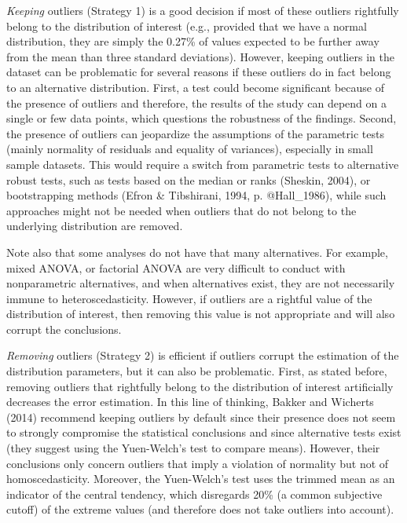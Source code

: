 \documentclass[man,floatsintext]{apa6}
\begin{document}
\emph{Keeping} outliers (Strategy 1) is a good decision if most of these outliers rightfully belong to the distribution of interest (e.g., provided that we have a normal distribution, they are simply the 0.27\% of values expected to be further away from the mean than three standard deviations). However, keeping outliers in the dataset can be problematic for several reasons if these outliers do in fact belong to an alternative distribution. First, a test could become significant because of the presence of outliers and therefore, the results of the study can depend on a single or few data points, which questions the robustness of the findings. Second, the presence of outliers can jeopardize the assumptions of the parametric tests (mainly normality of residuals and equality of variances), especially in small sample datasets. This would require a switch from parametric tests to alternative robust tests, such as tests based on the median or ranks (Sheskin, 2004), or bootstrapping methods (Efron \& Tibshirani, 1994, p. @Hall\_1986), while such approaches might not be needed when outliers that do not belong to the underlying distribution are removed.

Note also that some analyses do not have that many alternatives. For example, mixed ANOVA, or factorial ANOVA are very difficult to conduct with nonparametric alternatives, and when alternatives exist, they are not necessarily immune to heteroscedasticity. However, if outliers are a rightful value of the distribution of interest, then removing this value is not appropriate and will also corrupt the conclusions.

\emph{Removing} outliers (Strategy 2) is efficient if outliers corrupt the estimation of the distribution parameters, but it can also be problematic. First, as stated before, removing outliers that rightfully belong to the distribution of interest artificially decreases the error estimation. In this line of thinking, Bakker and Wicherts (2014) recommend keeping outliers by default since their presence does not seem to strongly compromise the statistical conclusions and since alternative tests exist (they suggest using the Yuen-Welch's test to compare means). However, their conclusions only concern outliers that imply a violation of normality but not of homoscedasticity. Moreover, the Yuen-Welch's test uses the trimmed mean as an indicator of the central tendency, which disregards 20\% (a common subjective cutoff) of the extreme values (and therefore does not take outliers into account).
\end{document}
